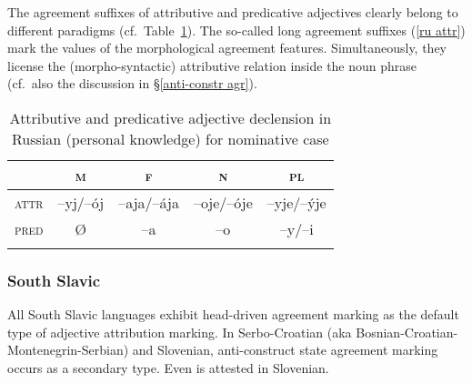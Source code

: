 The agreement suffixes of attributive and predicative adjectives clearly belong to different paradigms (cf.~Table~\ref{Russian adj agr paradigm}). The so-called long agreement suffixes (\ref{ru attr}) mark the values of the morphological agreement features. Simultaneously, they license the (morpho-syntactic) attributive relation inside the noun phrase (cf.~also the discussion in \S\ref{anti-constr agr}). 
\begin{table}[h]
\begin{tabular}{l c c c c}
\lsptoprule			
			&\textsc{m}	&\textsc{f}		&\textsc{n}	&\textsc{pl}\\
\midrule
\textsc{attr}	&–yj/–ój		&–aja/–ája	&–oje/–óje	&–yje/–\'yje\\
\textsc{pred}	&{Ø}		&–a			&–o			&–y/–i\\
\lspbottomrule
\end{tabular}
\caption[Adjective paradigm for Russian]{Attributive and predicative adjective declension in Russian (personal knowledge) for nominative case}
\label{Russian adj agr paradigm}
\end{table}

\subsubsection{South Slavic} \label{s-slavic synchr}
All South Slavic languages exhibit head\hyp{}driven agreement marking as the default type of adjective attribution marking. In Serbo-Croatian (aka Bosnian-Croatian-Montenegrin-Serbian) and Slovenian, anti\hyp{}construct state agreement marking occurs as a secondary type. Even  is attested in Slovenian.

